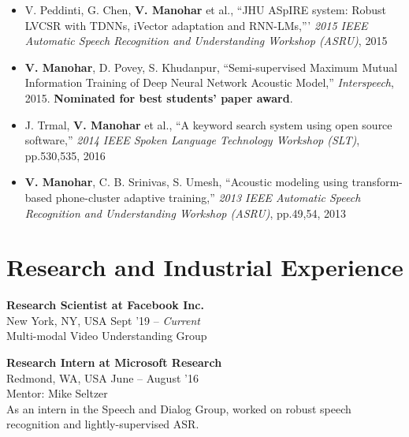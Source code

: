 \documentclass[margin,line,pifont,palatino,courier]{res}
\begin{document}
\begin{resume}
\begin{itemize}
  \item
    V. Peddinti, G. Chen, \textbf{V. Manohar} et al.,
    ``JHU ASpIRE system: Robust LVCSR with TDNNs, iVector adaptation and
    RNN-LMs,'''
    \textit{2015 IEEE Automatic Speech Recognition and Understanding Workshop (ASRU)}, 2015
  \item
    \textbf{V. Manohar}, D. Povey, S. Khudanpur,
    ``Semi-supervised Maximum Mutual Information Training of Deep Neural
    Network Acoustic Model,''
    \textit{Interspeech}, 2015. \textbf{Nominated for best students' paper award}.
  \item
    J. Trmal, \textbf{V. Manohar} et al.,
    ``A keyword search system using open source software,''
    \textit{2014 IEEE Spoken Language Technology Workshop (SLT)}, pp.530,535, 2016
  \item
    \textbf{V. Manohar}, C. B. Srinivas, S. Umesh,
    ``Acoustic modeling
    using transform-based phone-cluster adaptive training,''
    \textit{2013 IEEE Automatic Speech Recognition and Understanding Workshop (ASRU)}, pp.49,54, 2013
\end{itemize}

\section{\sc Research and Industrial Experience}

\textbf{Research Scientist at Facebook Inc.} \\
New York, NY, USA \hfill Sept '19 -- \textit{Current} \\
Multi-modal Video Understanding Group


\textbf{Research Intern at Microsoft Research} \\
Redmond, WA, USA \hfill
June -- August '16 \vspace{2pt} \\
Mentor: Mike Seltzer \\
As an intern in the Speech and Dialog Group, worked on robust speech recognition and lightly-supervised ASR.


\end{resume}
\end{document}
